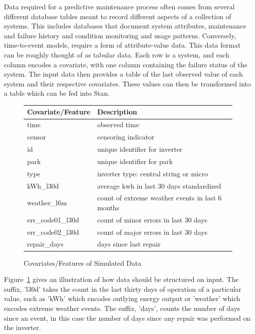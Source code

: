 Data required for a predictive maintenance process often comes from several different database tables meant to record different aspects of a collection of systems. This includes databases that document system attributes, maintenance and failure history and condition monitoring and usage patterns. Conversely, time-to-event models, require a form of attribute-value data. This data format can be roughly thought of as tabular data. Each row is a system, and each column encodes a covariate, with one column containing the failure status of the system. The input data then provides a table of the last observed value of each system and their respective covariates. These values can then be transformed into a table which can be fed into Stan. 



\begin{figure}[htbp]
  \centering
    \begin{tabular}{l|l}
    \textbf{Covariate/Feature} & \textbf{Description} \\
    \hline
    time  & observed time \\
    censor & censoring indicator  \\
    id    & unique identifier for inverter \\
    park  & unique identifier for park \\
    type  & inverter type: central string or micro \\
    kWh\_l30d & average kwh in last 30 days standardized \\
    weather\_l6m & count of extreme weather events in last 6 months \\
    err\_code01\_l30d & count of minor errors in last 30 days \\
    err\_code02\_l30d & count of major errors in last 30 days \\
    repair\_days & days since last repair \\
    \end{tabular}%
  \caption{Covariates/Features of Simulated Data}
  \label{dat_vars}%
\end{figure}%



Figure~\ref{dat_vars} gives an illustration of how data should be structured on input. The suffix, 'l30d' takes the count in the last thirty days of operation of a particular value, such as 'kWh' which encodes outlying energy output or 'weather' which encodes extreme weather events. The suffix, 'days', counts the number of days since an event, in this case the number of days since any repair was performed on the inverter. 

